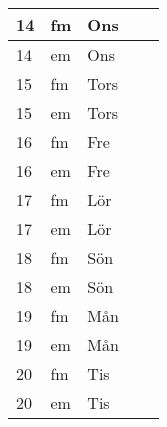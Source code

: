 \documentclass[a4paper]{article}
\begin{document}
\begin{table}[ht!]
\begin{tabular}{lllp{7cm}p{7cm}}
\multicolumn{1}{|l|}{14} & \multicolumn{1}{l|}{fm} & \multicolumn{1}{l|}{Ons} & \multicolumn{1}{l|}{} & \multicolumn{1}{l|}{} \\ \hline
\multicolumn{1}{|l|}{14} & \multicolumn{1}{l|}{em} & \multicolumn{1}{l|}{Ons} & \multicolumn{1}{l|}{} & \multicolumn{1}{l|}{} \\ \hline    

\multicolumn{1}{|l|}{15} & \multicolumn{1}{l|}{fm} & \multicolumn{1}{l|}{Tors} & \multicolumn{1}{l|}{} & \multicolumn{1}{l|}{} \\ \hline
\multicolumn{1}{|l|}{15} & \multicolumn{1}{l|}{em} & \multicolumn{1}{l|}{Tors} & \multicolumn{1}{l|}{} & \multicolumn{1}{l|}{} \\ \hline    

\multicolumn{1}{|l|}{16} & \multicolumn{1}{l|}{fm} & \multicolumn{1}{l|}{Fre} & \multicolumn{1}{l|}{} & \multicolumn{1}{l|}{} \\ \hline
\multicolumn{1}{|l|}{16} & \multicolumn{1}{l|}{em} & \multicolumn{1}{l|}{Fre} & \multicolumn{1}{l|}{} & \multicolumn{1}{l|}{} \\ \hline    

\multicolumn{1}{|l|}{17} & \multicolumn{1}{l|}{fm} & \multicolumn{1}{l|}{Lör} & \multicolumn{1}{l|}{} & \multicolumn{1}{l|}{} \\ \hline
\multicolumn{1}{|l|}{17} & \multicolumn{1}{l|}{em} & \multicolumn{1}{l|}{Lör} & \multicolumn{1}{l|}{} & \multicolumn{1}{l|}{} \\ \hline    

\multicolumn{1}{|l|}{18} & \multicolumn{1}{l|}{fm} & \multicolumn{1}{l|}{Sön} & \multicolumn{1}{l|}{} & \multicolumn{1}{l|}{} \\ \hline
\multicolumn{1}{|l|}{18} & \multicolumn{1}{l|}{em} & \multicolumn{1}{l|}{Sön} & \multicolumn{1}{l|}{} & \multicolumn{1}{l|}{} \\ \hline    

\multicolumn{1}{|l|}{19} & \multicolumn{1}{l|}{fm} & \multicolumn{1}{l|}{Mån} & \multicolumn{1}{l|}{} & \multicolumn{1}{l|}{} \\ \hline
\multicolumn{1}{|l|}{19} & \multicolumn{1}{l|}{em} & \multicolumn{1}{l|}{Mån} & \multicolumn{1}{l|}{} & \multicolumn{1}{l|}{} \\ \hline    

\multicolumn{1}{|l|}{20} & \multicolumn{1}{l|}{fm} & \multicolumn{1}{l|}{Tis} & \multicolumn{1}{l|}{} & \multicolumn{1}{l|}{} \\ \hline
\multicolumn{1}{|l|}{20} & \multicolumn{1}{l|}{em} & \multicolumn{1}{l|}{Tis} & \multicolumn{1}{l|}{} & \multicolumn{1}{l|}{} \\ \hline    


\end{tabular}
\end{table}
\end{document}
